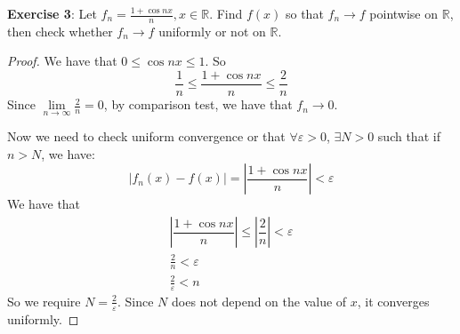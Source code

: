 \documentclass{article}
\begin{document}
\textbf{Exercise 3}: Let $f_{n} = \frac{1 + \cos{nx}}{n}, x \in \mathbb{R}$. Find $f(x)$ so that $f_{n} \rightarrow f$ pointwise on $\mathbb{R}$, then check whether $f_{n} \rightarrow f$ uniformly or not on $\mathbb{R}$.
    \begin{proof}
        We have that $0 \leq \cos{nx} \leq 1$. So
            \begin{equation*}
                \dfrac{1}{n} \leq\dfrac{1 + \cos{nx}}{n} \leq\dfrac{2}{n}
            \end{equation*}
        Since $\lim\limits_{n \to \infty}\frac{2}{n} = 0$, by comparison test, we have that $f_{n} \rightarrow 0$. 

        Now we need to check uniform convergence or that $\forall \varepsilon > 0$, $\exists N > 0$ such that if $n> N$, we have:
            \begin{equation*}
                \lvert f_{n}(x) - f(x) \rvert = \left\lvert \dfrac{1 + \cos{nx}}{n} \right\rvert< \varepsilon
            \end{equation*}
        We have that
            \begin{gather*}
                \left\lvert \dfrac{1 + \cos{nx}}{n} \right\rvert \leq \left\lvert \dfrac{2}{n} \right\rvert < \varepsilon \\
                \frac{2}{n} < \varepsilon \\
                \frac{2}{\varepsilon} < n
            \end{gather*}
        So we require $N = \frac{2}{\varepsilon}$. Since $N$ does not depend on the value of $x$, it converges uniformly.
    \end{proof}
\end{document}
